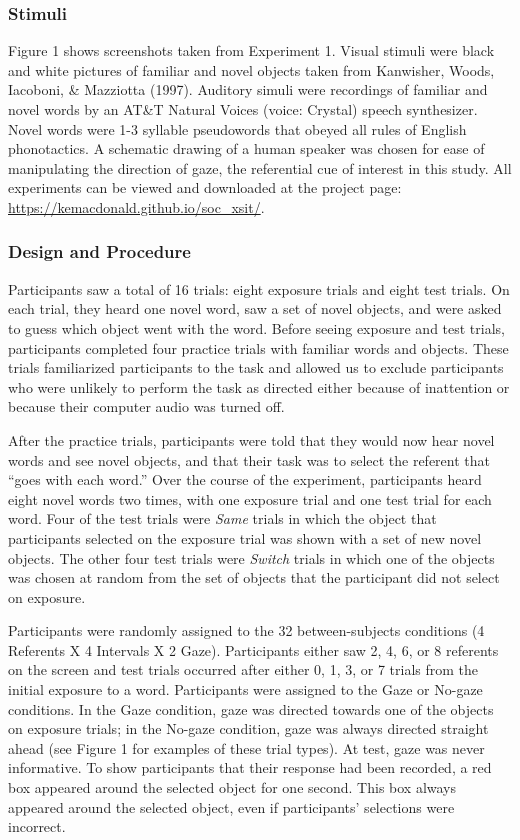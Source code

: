 \documentclass[authoryear, review]{elsarticle}
\begin{document}
\subsubsection{Stimuli}\label{stimuli}

Figure 1 shows screenshots taken from Experiment 1. Visual stimuli were
black and white pictures of familiar and novel objects taken from
Kanwisher, Woods, Iacoboni, \& Mazziotta (1997). Auditory simuli were
recordings of familiar and novel words by an AT\&T Natural Voices
\texttrademark (voice: Crystal) speech synthesizer. Novel words were 1-3
syllable pseudowords that obeyed all rules of English phonotactics. A
schematic drawing of a human speaker was chosen for ease of manipulating
the direction of gaze, the referential cue of interest in this study.
All experiments can be viewed and downloaded at the project page:
\url{https://kemacdonald.github.io/soc_xsit/}.

\subsubsection{Design and Procedure}\label{design-and-procedure}

Participants saw a total of 16 trials: eight exposure trials and eight
test trials. On each trial, they heard one novel word, saw a set of
novel objects, and were asked to guess which object went with the word.
Before seeing exposure and test trials, participants completed four
practice trials with familiar words and objects. These trials
familiarized participants to the task and allowed us to exclude
participants who were unlikely to perform the task as directed either
because of inattention or because their computer audio was turned off.

After the practice trials, participants were told that they would now
hear novel words and see novel objects, and that their task was to
select the referent that ``goes with each word.'' Over the course of the
experiment, participants heard eight novel words two times, with one
exposure trial and one test trial for each word. Four of the test trials
were \emph{Same} trials in which the object that participants selected
on the exposure trial was shown with a set of new novel objects. The
other four test trials were \emph{Switch} trials in which one of the
objects was chosen at random from the set of objects that the
participant did not select on exposure.

Participants were randomly assigned to the 32 between-subjects
conditions (4 Referents X 4 Intervals X 2 Gaze). Participants either saw
2, 4, 6, or 8 referents on the screen and test trials occurred after
either 0, 1, 3, or 7 trials from the initial exposure to a word.
Participants were assigned to the Gaze or No-gaze conditions. In the
Gaze condition, gaze was directed towards one of the objects on exposure
trials; in the No-gaze condition, gaze was always directed straight
ahead (see Figure 1 for examples of these trial types). At test, gaze
was never informative. To show participants that their response had been
recorded, a red box appeared around the selected object for one second.
This box always appeared around the selected object, even if
participants' selections were incorrect.
\end{document}
